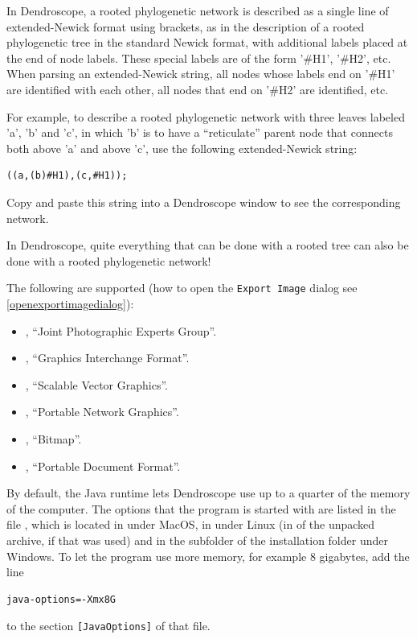 \documentclass[11pt]{article}
\def\Dendroscope{{\sf Dendroscope }}
\newcommand{\cs}[1]{\textcolor{red}{#1}}
\begin{document}
In Dendroscope, a rooted phylogenetic network is described as a single line of extended-Newick format using brackets, as in the
description of a rooted phylogenetic tree in the standard Newick format, with additional
labels placed at the end of node labels. These special labels are of the form
'\#H1', '\#H2', etc. When parsing an extended-Newick string, all nodes whose labels end on '\#H1' are identified
with each other, all nodes that end on '\#H2' are identified, etc.

For example, to describe a rooted phylogenetic network with three leaves labeled 'a', 'b' and 'c',
in which 'b' is to have a ``reticulate'' parent node that connects both above 'a' and above 'c',
use the following extended-Newick string:
\begin{verbatim}
((a,(b)#H1),(c,#H1));
\end{verbatim}
Copy and paste this string into a Dendroscope window to see the corresponding network.

In Dendroscope, quite everything that can be done with a rooted tree can also be done with a rooted phylogenetic network!

The following  are supported (how to open the \texttt{Export Image} dialog see \ref{openexportimagedialog}):

\begin{itemize}
\item {}, ``Joint Photographic Experts Group''.
\item {}, ``Graphics Interchange Format''.
\item {}, ``Scalable Vector Graphics''.
\item {}, ``Portable Network Graphics''.
\item {}, ``Bitmap''.
\item {}, ``Portable Document Format''. %
\end{itemize}



By default, the Java runtime lets \Dendroscope use up to a quarter of the memory of the computer.
The options that the program is started with are listed in the file , which is located in
 under MacOS, in  under Linux (in 
of the unpacked archive, if that was used) and in the subfolder  of the installation folder under Windows.
To let the program use more memory, for example 8 gigabytes, add the line
\begin{verbatim}
java-options=-Xmx8G
\end{verbatim}
to the section \verb"[JavaOptions]" of that file.
\end{document}
